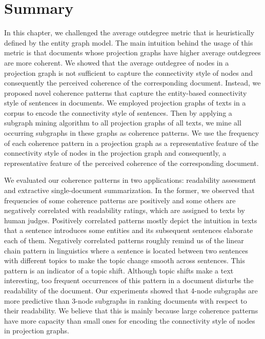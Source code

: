 \section{Summary}
\label{sec:summary}

In this chapter, we challenged the average outdegree metric that is heuristically defined by the entity graph model. 
The main intuition behind the usage of this metric is that documents whose projection graphs have higher average outdegrees are more coherent. 
We showed that the average outdegree of nodes in a projection graph is not sufficient to capture the connectivity style of nodes and consequently the perceived coherence of the corresponding document. 
Instead, we proposed novel coherence patterns that capture the entity-based connectivity style of sentences in documents. 
We employed projection graphs of texts in a corpus to encode the connectivity style of sentences.  
Then by applying a subgraph mining algorithm to all projection graphs of all texts, we mine all occurring subgraphs in these graphs as coherence patterns. 
We use the frequency of each coherence pattern in a projection graph as a representative feature of the connectivity style of nodes in the projection graph and consequently, a representative feature of the perceived coherence of the corresponding document. 

We evaluated our coherence patterns in two applications: readability assessment and extractive \mbox{single-document} summarization. 
In the former, we observed that frequencies of some coherence patterns are positively and some others are negatively correlated with readability ratings, which are assigned to texts by human judges. 
Positively correlated patterns mostly depict the intuition in texts that a sentence introduces some entities and its subsequent sentences elaborate each of them.  
Negatively correlated patterns roughly remind us of the linear chain pattern in linguistics where a sentence is located between two sentences with different topics to make the topic change smooth across sentences. 
This pattern is an indicator of a topic shift.  
Although topic shifts make a text interesting, too frequent occurrences of this pattern in a document disturbs the readability of the document. 
Our experiments showed that 4-node subgraphs are more predictive than 3-node subgraphs in ranking documents with respect to their readability. 
We believe that this is mainly because large coherence patterns have more capacity than small ones for encoding the connectivity style of nodes in projection graphs. 

